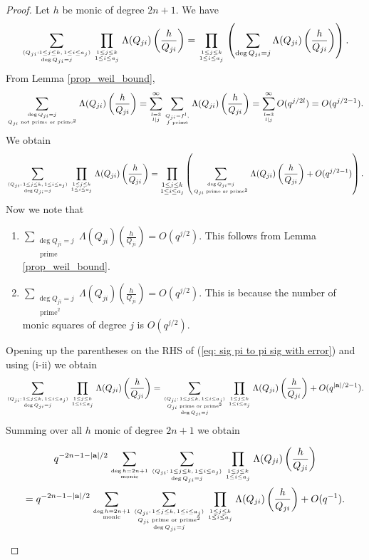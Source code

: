 \documentclass[alphabetic, 
        colorlinks,
        linkcolor=red,  citecolor=blue,
        backref
]{amsart}
\numberwithin{equation}{section}
\theoremstyle{definition}
\begin{document}
\begin{proof}
Let $h$ be monic of degree $2n+1$. We have 
$$
\sum_{(Q_{ji}:1\le j\le k,\,1\le i\le a_j)\atop{\deg Q_{ji}=j}}\prod_{1\le j\le k\atop{1\le i\le a_j}}\Lambda(Q_{ji})\left(\frac h{Q_{ji}}\right)=\prod_{1\le j\le k\atop{1\le i\le a_j}}\left(\sum_{\deg Q_{ji}=j}\Lambda(Q_{ji})\left(\frac{h}{Q_{ji}}\right)\right).
$$
From Lemma \ref{prop_weil_bound},
$$
\sum_{\deg Q_{ji}=j\atop{Q_{ji}\text{ not prime or prime}^2}}\Lambda(Q_{ji})\left(\frac{h}{Q_{ji}}\right)=\sum_{l=3\atop{l|j}}^\infty \sum_{Q_{ji}=f^l,\atop{f\text{ prime}}}\Lambda(Q_{ji})\left(\frac{h}{Q_{ji}}\right)=\sum_{l=3\atop{l|j}}^\infty O(q^{j/2l})=O(q^{j/2-1}).
$$
We obtain
\begin{equation}\label{eq: sig pi to pi sig with error}
\sum_{(Q_{ji}:\,1\le j\le k,\,1\le i\le a_j)\atop{\deg Q_{ji}=j}}\prod_{1\le j\le k\atop{1\le i\le a_j}}\Lambda(Q_{ji})\left(\frac h{Q_{ji}}\right)=\prod_{\substack{1\le j\le k\\ 1\le i\le a_j}}\left(\sum_{\deg Q_{ji}=j\atop{Q_{ji}\text{ prime or prime}^2}}\Lambda(Q_{ji})\left(\frac{h}{Q_{ji}}\right)
+O(q^{j/2-1})
\right).
\end{equation}
Now we note that
\begin{enumerate}
    \item[(i)] $\sum_{\substack{\deg Q_{ji}=j\\ \text{ prime}}}\Lambda(Q_{ji})\left(\frac{h}{Q_{ji}}\right)=O(q^{j/2})$. This follows from Lemma \ref{prop_weil_bound}. 
    \item[(ii)] $\sum_{\substack{\deg Q_{ji}=j\\ \text{ prime}^2}}\Lambda(Q_{ji})\left(\frac{h}{Q_{ji}}\right)=O(q^{j/2})$. This is because the number of monic squares of degree $j$ is $O(q^{j/2})$. 
\end{enumerate}
Opening up the parentheses on the RHS of (\ref{eq: sig pi to pi sig with error}) and using (i-ii) we obtain
$$
\sum_{(Q_{ji}:\,1\le j\le k,\,1\le i\le a_j)\atop{\deg Q_{ji}=j}}\prod_{1\le j\le k\atop{1\le i\le a_j}}\Lambda(Q_{ji})\left(\frac h{Q_{ji}}\right)=\sum_{(Q_{ji}:\,1\le j\le k,\,1\le i\le a_j)\atop{Q_{ji}\text{ prime or prime}^2\atop{\deg Q_{ji}=j}}}\prod_{1\le j\le k\atop{1\le i\le a_j}}\Lambda(Q_{ji})\left(\frac h{Q_{ji}}\right)+O(q^{|\mathbf a|/2-1}).
$$
Summing over all $h$ monic of degree $2n+1$ we obtain 
\begin{samepage}
\begin{multline}
\label{eq: restrict to prime and prime2}
q^{-2n-1-|\mathbf a|/2}\sum_{\deg h=2n+1\atop{\mathrm{monic}}}\sum_{(Q_{ji}:\,1\le j\le k,\,1\le i\le a_j)\atop{\deg Q_{ji}=j}}\prod_{1\le j\le k\atop{1\le i\le a_j}}\Lambda(Q_{ji})\left(\frac h{Q_{ji}}\right)
\\ =
q^{-2n-1-|\mathbf a|/2}\sum_{\deg h=2n+1\atop{\mathrm{monic}}}
\sum_{(Q_{ji}:\,1\le j\le k,\,1\le i\le a_j)\atop{Q_{ji}\text{ prime or prime}^2\atop{\deg Q_{ji}=j}}}\prod_{1\le j\le k\atop{1\le i\le a_j}}\Lambda(Q_{ji})\left(\frac h{Q_{ji}}\right)+O(q^{-1}).
\end{multline}  
\end{samepage}


\end{proof}
\end{document}
